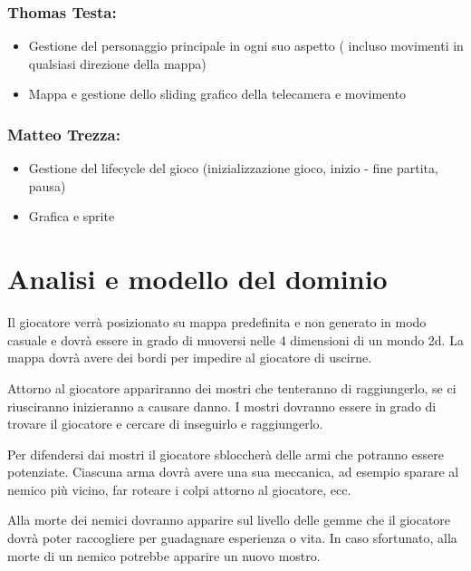 \documentclass[a4paper,12pt]{report}
\begin{document}
\paragraph{}

\subsubsection*{Thomas Testa:}
\begin{itemize}
	\item Gestione del personaggio principale in ogni suo aspetto ( incluso movimenti in qualsiasi direzione della mappa)
	\item Mappa e gestione dello sliding grafico della telecamera e movimento
\end{itemize}

\paragraph{}

\subsubsection*{Matteo Trezza:}
\begin{itemize}
	\item Gestione del lifecycle del gioco (inizializzazione gioco, inizio - fine partita, pausa)
	\item Grafica e sprite
\end{itemize}


\section{Analisi e modello del dominio}
 Il giocatore verrà posizionato su mappa predefinita e non generato in modo casuale e dovrà essere in grado di muoversi nelle 4 dimensioni di un mondo 2d. 
 La mappa dovrà avere dei bordi per impedire al giocatore di uscirne. 


 Attorno al giocatore appariranno dei mostri che tenteranno di raggiungerlo, se ci riusciranno inizieranno a causare danno. I mostri dovranno essere in grado di trovare il giocatore e cercare di inseguirlo e raggiungerlo.
 
 
 Per difendersi dai mostri il giocatore sbloccherà delle armi che potranno essere potenziate. Ciascuna arma dovrà avere una sua meccanica, ad esempio sparare al nemico più vicino, far roteare i colpi attorno al giocatore, ecc. 
 
 
 Alla morte dei nemici dovranno apparire sul livello delle gemme che il giocatore dovrà poter raccogliere per guadagnare esperienza o vita. In caso sfortunato, alla morte di un nemico potrebbe apparire un nuovo mostro.
 
\end{document}
